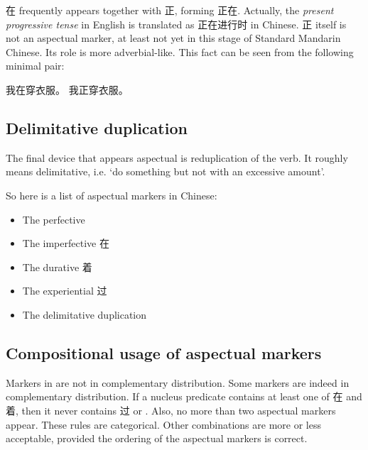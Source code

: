 在 frequently appears together with 正, forming 正在. 
Actually, the \emph{present progressive tense} in English is translated as 正在进行时 in Chinese.
正 itself is not an aspectual marker, at least not yet in this stage of Standard Mandarin Chinese.
Its role is more adverbial-like.
This fact can be seen from the following minimal pair:
\begin{exe}
    \ex \begin{xlist}
        \ex 我在穿衣服。
        \ex *我正穿衣服。%
    \end{xlist}
\end{exe}

\subsection{Delimitative duplication}\label{sec:delimitative-duplication}

The final device that appears aspectual is reduplication of the verb. 
It roughly means delimitative, i.e. `do something but not with an excessive amount'.

So here is a list of aspectual markers in Chinese: 
\begin{itemize}
    \item The perfective 
    \item The imperfective 在
    \item The durative 着
    \item The experiential 过
    \item The delimitative duplication
\end{itemize}

\subsection{Compositional usage of aspectual markers}

Markers in  are not in complementary distribution.
Some markers are indeed in complementary distribution. 
If a nucleus predicate contains at least one of 在 and 着, 
then it never contains 过 or .
Also, no more than two aspectual markers appear.
These rules are categorical. Other combinations are more or less acceptable,
provided the ordering of the aspectual markers is correct.

